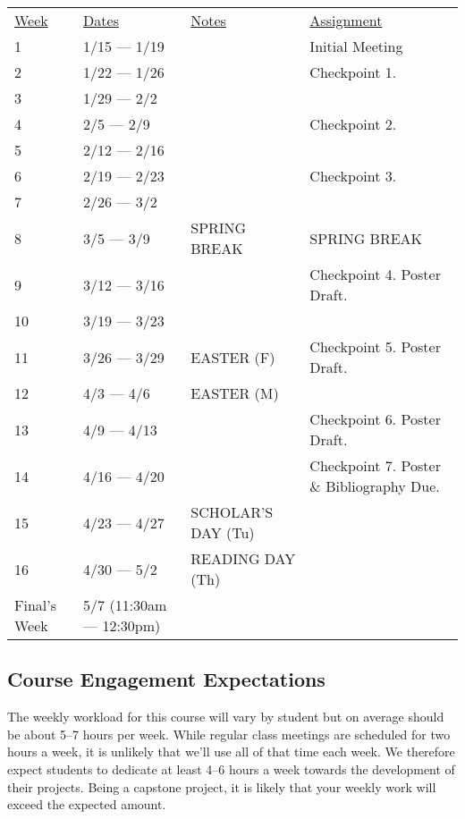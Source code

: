 \documentclass[nobib]{tufte-handout}
\begin{document}
\begin{center}
\begin{tabular}{llll}
\underline{Week} & \underline{Dates} & \underline{Notes} & \underline{Assignment}\\
1 & 1/15 --- 1/19 & & Initial Meeting  \\
2 & 1/22 --- 1/26 & & Checkpoint 1. \\
3 & 1/29 --- 2/2 &  &  \\
4 & 2/5 --- 2/9 &  & Checkpoint 2. \\
5 & 2/12 --- 2/16 & &\\
6 & 2/19 --- 2/23 & & Checkpoint 3. \\
7 & 2/26 --- 3/2 &  &  \\
8 & 3/5 --- 3/9 & SPRING BREAK & SPRING BREAK \\
9 & 3/12 --- 3/16 & & Checkpoint 4. Poster Draft.  \\
10 & 3/19 --- 3/23 &  &\\
11 & 3/26 --- 3/29 & EASTER (F)  & Checkpoint 5. Poster Draft. \\
12 & 4/3 --- 4/6 & EASTER (M)  & \\
13 & 4/9 --- 4/13 &  & Checkpoint 6. Poster Draft. \\
14 & 4/16 --- 4/20 & & Checkpoint 7. Poster \& Bibliography Due. \\
15 & 4/23 --- 4/27 & SCHOLAR'S DAY (Tu)  & \\
16 & 4/30 --- 5/2 & READING DAY (Th) & \\
Final's Week & 5/7 (11:30am --- 12:30pm) &  &  \\
\end{tabular}
\end{center}


\subsection{Course Engagement Expectations}

The weekly workload for this course will vary by student but on average should be about 5--7 hours per week.  While regular class meetings are scheduled for two hours a week, it is unlikely that we'll use all of that time each week.  We therefore expect students to dedicate at least 4--6 hours a week towards the development of their projects.  Being a capstone project, it is likely that your weekly work will exceed the expected amount.
\end{document}
